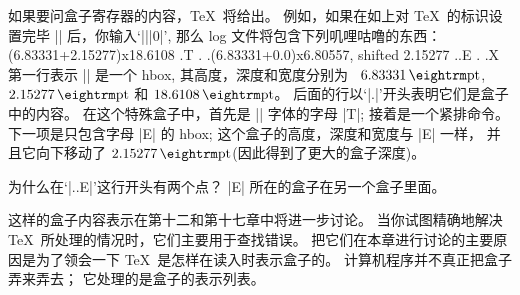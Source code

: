 \danger 如果要问盒子寄存器的内容，\TeX\ 将给出。%
例如，如果在如上对 \TeX\ 的标识设置完毕 || 后，你输入`|\showbox||0|',
那么 log 文件将包含下列叽哩咕噜的东西：
\begintt
\hbox(6.83331+2.15277)x18.6108
.\tenrm T
.
.\hbox(6.83331+0.0)x6.80557, shifted 2.15277
..\tenrm E
.
.\tenrm X
\endtt
第一行表示 || 是一个 hbox, 其高度，深度和宽度分别为%
~$6.83331\pt$, $2.15277\pt$ 和 $18.6108\pt$。%
后面的行以`|.|'开头表明它们是盒子中的内容。%
在这个特殊盒子中，首先是 |\tenrm| 字体的字母 |T|;
接着是一个紧排命令。%
下一项是只包含字母 |E| 的 hbox;
这个盒子的高度，深度和宽度与 |E| 一样，
并且它向下移动了 $2.15277\pt$(因此得到了更大的盒子深度)。

\dangerexercise 为什么在`|..\tenrm E|'这行开头有两个点？
\answer |E| 所在的盒子在另一个盒子里面。

\danger 这样的盒子内容表示在第十二和第十七章中将进一步讨论。%
当你试图精确地解决 \TeX\ 所处理的情况时，它们主要用于查找错误。%
把它们在本章进行讨论的主要原因是为了领会一下 \TeX\ 是怎样在读入时表示盒子的。%
\1计算机程序并不真正把盒子弄来弄去；
它处理的是盒子的表示列表。

